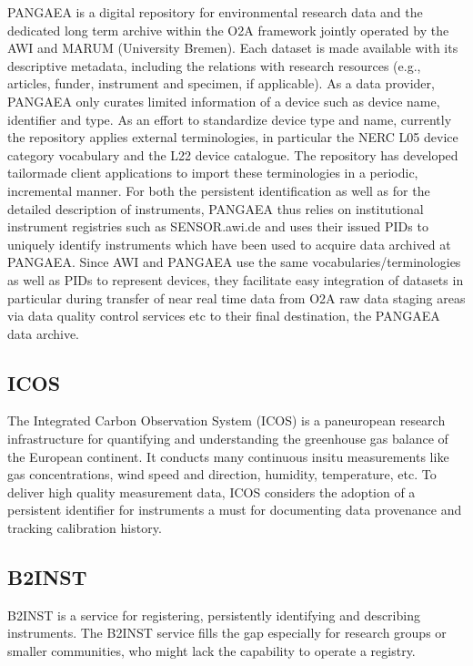 \documentclass[a4paper,10pt,english]{sphinxmanual}
\begin{document}
\sphinxAtStartPar
PANGAEA is a digital repository for environmental research data and
the dedicated long term archive within the O2A framework jointly
operated by the AWI and MARUM (University Bremen).  Each dataset is
made available with its descriptive metadata, including the relations
with research resources (e.g., articles, funder, instrument and
specimen, if applicable).  As a data provider, PANGAEA only curates
limited information of a device such as device name, identifier and
type.  As an effort to standardize device type and name, currently the
repository applies external terminologies, in particular the NERC L05
device category vocabulary and the L22 device catalogue.  The
repository has developed tailor\sphinxhyphen{}made client applications to import
these terminologies in a periodic, incremental manner.  For both the
persistent identification as well as for the detailed description of
instruments, PANGAEA thus relies on institutional instrument
registries such as SENSOR.awi.de and uses their issued PIDs to
uniquely identify instruments which have been used to acquire data
archived at PANGAEA.  Since AWI and PANGAEA use the same
vocabularies/terminologies as well as PIDs to represent devices, they
facilitate easy integration of datasets in particular during transfer
of near real time data from O2A raw data staging areas via data
quality control services etc to their final destination, the PANGAEA
data archive.\sphinxfootnotemark[5]


\subsection{ICOS}
\label{\detokenize{white-paper/adoption:icos}}
\sphinxAtStartPar
The Integrated Carbon Observation System (ICOS) is a pan\sphinxhyphen{}european
research infrastructure for quantifying and understanding the
greenhouse gas balance of the European continent.  It conducts many
continuous in\sphinxhyphen{}situ measurements like gas concentrations, wind speed
and direction, humidity, temperature, etc.  To deliver high quality
measurement data, ICOS considers the adoption of a persistent
identifier for instruments a must for documenting data provenance and
tracking calibration history.


\subsection{B2INST}
\label{\detokenize{white-paper/adoption:b2inst}}
\sphinxAtStartPar
B2INST is a service for registering, persistently identifying and
describing instruments.  The B2INST service fills the gap especially
for research groups or smaller communities, who might lack the
capability to operate a registry.
\end{document}
